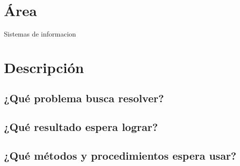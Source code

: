 \documentclass{article}
\begin{document}


\section{Área}

Sistemas de informacion

\section{Descripción}

\subsection{¿Qué problema busca resolver?}

\subsection{¿Qué resultado espera lograr?}

\subsection{¿Qué métodos y procedimientos espera usar?}
\end{document}
